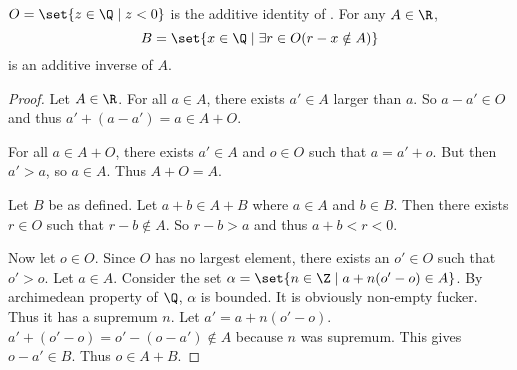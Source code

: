 \begin{proposition*} \label{thm:R:dedekind:negative}
    $O = \set{z \in \Q \mid z < 0}$ is the additive identity of \R.
    For any $A \in \R$, \[
        B = \set{x \in \Q \mid \exists r \in O (r - x \notin A)}
    \] is an additive inverse of $A$.
\end{proposition*}
\begin{proof}
    Let $A \in \R$.
    For all $a \in A$, there exists $a' \in A$ larger than $a$.
    So $a - a' \in O$ and thus $a' + (a - a') = a \in A + O$.

    For all $a \in A + O$, there exists $a' \in A$ and $o \in O$ such that
    $a = a' + o$.
    But then $a' > a$, so $a \in A$.
    Thus $A + O = A$.

    Let $B$ be as defined.
    Let $a + b \in A + B$ where $a \in A$ and $b \in B$.
    Then there exists $r \in O$ such that $r - b \notin A$.
    So $r - b > a$ and thus $a + b < r < 0$.

    Now let $o \in O$.
    Since $O$ has no largest element, there exists an $o' \in O$ such that
    $o' > o$.
    Let $a \in A$.
    Consider the set $\alpha = \set{n \in \Z \mid a + n(o' - o) \in A}$.
    By archimedean property of $\Q$, $\alpha$ is bounded.
    It is obviously non-empty fucker.
    Thus it has a supremum $n$.
    Let $a' = a + n(o' - o)$.
    $a' + (o' - o) = o' - (o - a') \notin A$ because $n$ was supremum.
    This gives $o - a' \in B$.
    Thus $o \in A + B$.
\end{proof}

